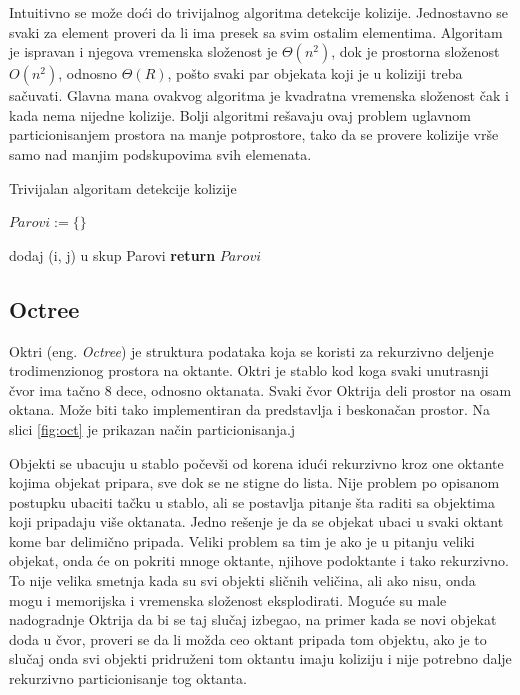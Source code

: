 \documentclass{article}
\begin{document}
{Intuitivno se može doći do trivijalnog algoritma detekcije kolizije. 
Jednostavno se svaki za element proveri da li ima presek sa svim ostalim elementima.
Algoritam je ispravan i njegova vremenska složenost je $\Theta (n^2) $, dok je prostorna složenost
$O(n^2)$, odnosno $\Theta(R)$, pošto svaki par objekata koji je u koliziji treba sačuvati.
Glavna mana ovakvog algoritma je kvadratna vremenska složenost čak i kada nema nijedne kolizije.
Bolji algoritmi rešavaju ovaj problem uglavnom particionisanjem prostora na manje potprostore, tako da
se provere kolizije vrše samo nad manjim podskupovima svih elemenata.

\begin{algorithm}
	\caption{Trivijalan algoritam detekcije kolizije}
    \label{alg:triv}
	\begin{algorithmic}[1]
		\State $Parovi := \{ \}$

				\State dodaj (i, j) u skup Parovi
			\EndIf		
		\EndFor
		\EndFor
		\State \textbf{return} $Parovi$
		\EndProcedure
    \end{algorithmic}
\end{algorithm}

\subsection{Octree}
\label{subsec:octree}

Oktri (eng. {\em Octree}) je struktura podataka koja se koristi za rekurzivno deljenje trodimenzionog
prostora na oktante. Oktri je stablo kod koga svaki unutrasnji čvor ima tačno 8 dece, odnosno oktanata. 
Svaki čvor Oktrija deli prostor na osam oktana.
Može biti tako implementiran da predstavlja i beskonačan prostor.
Na slici \ref{fig:oct} je prikazan način particionisanja.j

Objekti se ubacuju u stablo počevši od korena idući rekurzivno kroz one oktante kojima objekat pripara,
sve dok se ne stigne do lista.
Nije problem po opisanom postupku ubaciti tačku u stablo, ali se postavlja pitanje šta raditi sa objektima
koji pripadaju više oktanata.
Jedno rešenje je da se objekat ubaci u svaki oktant kome bar delimično pripada. 
Veliki problem sa tim je ako je u pitanju veliki objekat, onda će on pokriti mnoge oktante, njihove 
podoktante i tako rekurzivno. To nije velika smetnja kada su svi objekti sličnih veličina, ali ako 
nisu, onda mogu i memorijska i vremenska složenost eksplodirati. 
Moguće su male nadogradnje Oktrija da bi se taj slučaj izbegao, na primer kada se novi objekat doda 
u čvor, proveri se da li možda ceo oktant pripada tom objektu, ako je to slučaj onda svi objekti pridruženi
tom oktantu imaju koliziju i nije potrebno dalje rekurzivno particionisanje tog oktanta.

}
\end{document}

